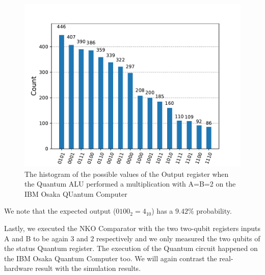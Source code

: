 \begin{figure}[!ht]
        \centering
        \includegraphics[scale=0.7]{images/6_Complete_System/multiplier_ibmq_result.pdf}
        \caption{The histogram of the possible values of the Output register when the Quantum ALU performed a multiplication with A=B=2 on the IBM Osaka QUantum Computer}
\end{figure}

We note that the expected output ($0100_2=4_{10}$) has a $9.42\%$ probability.

Lastly, we executed the NKO Comparator with the two two-qubit registers inputs A and B to be again $3$ and $2$ respectively and we only measured the two qubits
of the status Quantum register. The execution of the Quantum circuit happened on the IBM Osaka Quantum Computer too. We will again contrast the real-hardware result with the
simulation results.

